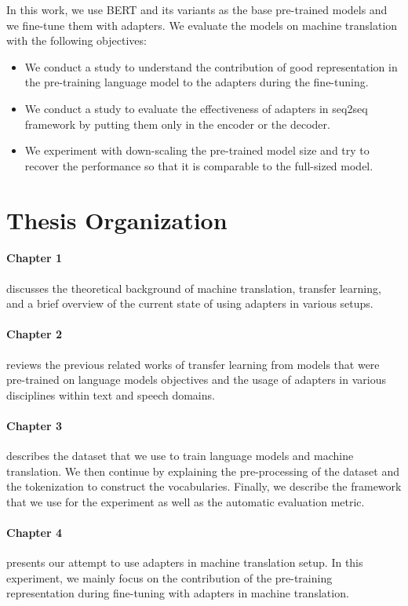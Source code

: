 In this work, we use BERT and its variants as the base pre-trained models and we fine-tune them with adapters. We evaluate the models on machine translation with the following objectives:
\begin{itemize}
    \item We conduct a study to understand the contribution of good representation in the pre-training language model to the adapters during the fine-tuning.
    \item We conduct a study to evaluate the effectiveness of adapters in seq2seq framework by putting them only in the encoder or the decoder.
    \item We experiment with down-scaling the pre-trained model size and try to recover the performance so that it is comparable to the full-sized model.
\end{itemize}

\section*{Thesis Organization}

\paragraph{Chapter 1} discusses the theoretical background of machine translation, transfer learning, and a brief overview of the current state of using adapters in various setups.

\paragraph{Chapter 2} reviews the previous related works of transfer learning from models that were pre-trained on language models objectives and the usage of adapters in various disciplines within text and speech domains.

\paragraph{Chapter 3} describes the dataset that we use to train language models and machine translation. We then continue by explaining the pre-processing of the dataset and the tokenization to construct the vocabularies. Finally, we describe the framework that we use for the experiment as well as the automatic evaluation metric.

\paragraph{Chapter 4} presents our attempt to use adapters in machine translation setup. In this experiment, we mainly focus on the contribution of the pre-training representation during fine-tuning with adapters in machine translation.

